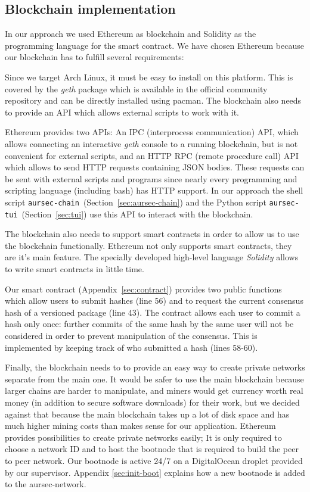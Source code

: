 \subsection{Blockchain implementation}\label{sec:aur-block}
In our approach we used Ethereum as blockchain and Solidity as the programming language for the smart contract.
We have chosen Ethereum because our blockchain has to fulfill several requirements:

Since we target Arch Linux, it must be easy to install on this platform.
This is covered by the \emph{geth} package which is available in the official community repository and can be directly installed using pacman.
The blockchain also needs to provide an API which allows external scripts to work with it.

Ethereum provides two APIs:
An IPC (interprocess communication) API, which allows connecting an interactive \emph{geth} console to a running blockchain, but is not convenient for external scripts,
and an HTTP RPC (remote procedure call) API which allows to send HTTP requests containing JSON bodies.
These requests can be sent with external scripts and programs since nearly every programming and scripting language (including bash) has HTTP support.
In our approach the shell script \texttt{aursec-chain}~(Section~\ref{sec:aursec-chain}) and the Python script \texttt{aursec-tui}~(Section~\ref{sec:tui}) use this API to interact with the blockchain.

The blockchain also needs to support smart contracts in order to allow us to use the blockchain functionally.
Ethereum not only supports smart contracts, they are it's main feature.
The specially developed high-level language \emph{Solidity} allows to write smart contracts in little time.

Our smart contract (Appendix~\ref{sec:contract}) provides two public functions which allow users to submit hashes (line 56) and to request the current consensus hash of a versioned package (line 43).
The contract allows each user to commit a hash only once: further commits of the same hash by the same user will not be considered in order to prevent manipulation of the consensus. This is implemented by keeping track of who submitted a hash (lines 58-60).

Finally, the blockchain needs to to provide an easy way to create private networks separate from the main one.
It would be safer to use the main blockchain because larger chains are harder to manipulate, and miners would get currency worth real money (in addition to secure software downloads) for their work, but we decided against that because the main blockchain takes up a lot of disk space and has much higher mining costs than makes sense for our application.
Ethereum provides possibilities to create private networks easily; It is only required to choose a network ID and to host the bootnode that is required to build the peer to peer network.
Our bootnode is active 24/7 on a DigitalOcean droplet provided by our supervisor.
Appendix \ref{sec:init-boot} explains how a new bootnode is added to the aursec-network.
